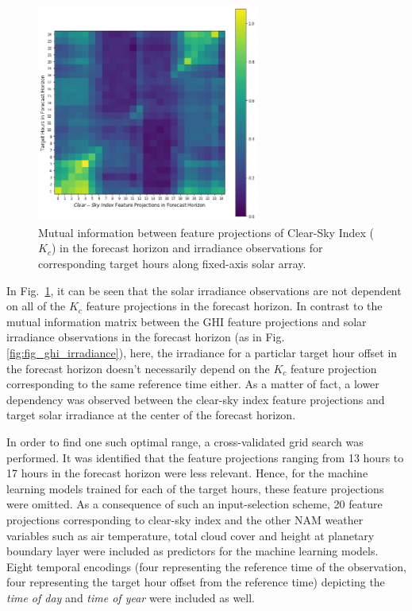 \begin{figure}[htb]
    \begin{center}
    	\includegraphics[width=0.65\textwidth]{chapter4/fig_kc_target_mi.png}
    	\caption[Mutual information between Clear-Sky Index feature projections in forecast horizon and irradiance observations for corresponding target hours from fixed-axis solar array]{Mutual information between feature projections of Clear-Sky Index ($K_c$) in the forecast horizon and irradiance observations for corresponding target hours along fixed-axis solar array.}
    	\label{fig:fig_kc_target_mi}
    \end{center}
\end{figure}

\par In Fig.~\ref{fig:fig_kc_target_mi}, it can be seen that the solar irradiance observations are not dependent on all of the $K_c$ feature projections in the forecast horizon. In contrast to the mutual information matrix between the GHI feature projections and solar irradiance observations in the forecast horizon (as in Fig. \ref{fig:fig_ghi_irradiance}), here, the irradiance for a particlar target hour offset in the forecast horizon doesn't necessarily depend on the $K_c$ feature projection corresponding to the same reference time either. As a matter of fact, a lower dependency was observed between the clear-sky index feature projections and target solar irradiance at the center of the forecast horizon.

\par In order to find one such optimal range, a cross-validated grid search was performed. It was identified that the feature projections ranging from 13 hours to 17 hours in the forecast horizon were less relevant. Hence, for the machine learning models trained for each of the target hours, these feature projections were omitted. As a consequence of such an input-selection scheme, 20 feature projections corresponding to clear-sky index and the other NAM weather variables such as air temperature, total cloud cover and height at planetary boundary layer were included as predictors for the machine learning models. Eight temporal encodings (four representing the reference time of the observation, four representing the target hour offset from the reference time) depicting the \textit{time of day} and \textit{time of year} were included as well.

